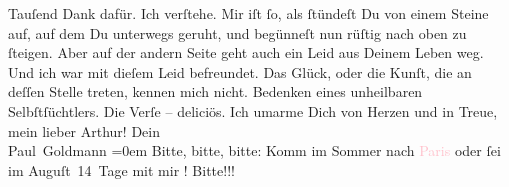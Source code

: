                Tauſend Dank dafür. Ich verſtehe. Mir iſt ſo, als ſtündeſt Du von einem Steine auf,
               auf dem Du unterwegs geruht, und begünneſt nun rüſtig nach oben zu ſteigen. Aber auf
               der andern Seite geht auch ein  Leid aus Deinem
               Leben weg. Und ich war mit dieſem Leid befreundet. Das Glück, oder die Kunſt, die an
               deſſen Stelle treten, kennen mich nicht. Bedenken eines unheilbaren
               Selbſtſüchtlers.\pend
           \pstart
           Die Verſe – deliciös.\pend
           \pstart
           Ich umarme Dich von Herzen und in Treue, mein lieber Arthur!\pend
           \pstart
           Dein {\\[\baselineskip]}\spacefill\mbox{Paul Goldmann}\pend
           \leftskip=0em{}\pstart
           \noindent{}{\pb}Bitte, bitte, bitte: Komm im Sommer nach \textcolor{pink}{Paris}{}\ledrightnote{\textcolor{pink}{Paris}} oder ſei im Auguſt 14 Tage mit mir \label{K_L02697-1v}\label{K_L02697-1h}! Bitte!!!\pend
           \endnumbering{}  
      